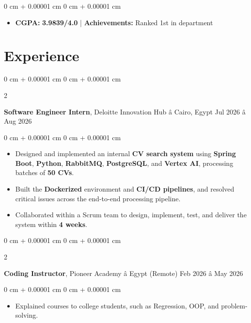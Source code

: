 \documentclass[9pt, letterpaper]{extarticle}
\newenvironment{highlights}{
    \begin{itemize}[
        topsep=0.06 cm,
        parsep=0.06 cm,
        partopsep=0pt,
        itemsep=0pt,
        leftmargin=0 cm + 10pt
    ]
}{
    \end{itemize}
} %
\newenvironment{onecolentry}{
    \begin{adjustwidth}{
        0 cm + 0.00001 cm
    }{
        0 cm + 0.00001 cm
    }
}{
    \end{adjustwidth}
} %
\newenvironment{twocolentry}[2][]{
    \onecolentry
    \def\secondColumn{#2}
    \setcolumnwidth{\fill, 4.5 cm}
    \begin{paracol}{2}
}{
    \switchcolumn \raggedleft \secondColumn
    \end{paracol}
    \endonecolentry
} %
\begin{document}
        \begin{onecolentry}
            \begin{highlights}
                \item \textbf{CGPA:} \textbf{3.9839/4.0} \hspace{1em}|\hspace{1em} \textbf{Achievements:} Ranked 1st in department
            \end{highlights}
        \end{onecolentry}

    \section{Experience}

        \begin{twocolentry}{
            Jul 2026 â Aug 2026
        }
            \textbf{Software Engineer Intern}, Deloitte Innovation Hub â Cairo, Egypt\end{twocolentry}

        \begin{onecolentry}
            \begin{highlights}
                \item Designed and implemented an internal \textbf{CV search system} using \textbf{Spring Boot}, \textbf{Python}, \textbf{RabbitMQ}, \textbf{PostgreSQL}, and \textbf{Vertex AI}, processing batches of \textbf{50 CVs}.

                \item Built the \textbf{Dockerized} environment and \textbf{CI/CD pipelines}, and resolved critical issues across the end-to-end processing pipeline.

                \item Collaborated within a Scrum team to design, implement, test, and deliver the system within \textbf{4 weeks}.
            \end{highlights}
        \end{onecolentry}

        \begin{twocolentry}{
            Feb 2026 â May 2026
        }
            \textbf{Coding Instructor}, Pioneer Academy â Egypt (Remote) \end{twocolentry}

        \begin{onecolentry}
            \begin{highlights}
                \item Explained courses to college students, such as Regression, OOP, and problem-solving.
            \end{highlights}
        \end{onecolentry}
\end{document}
